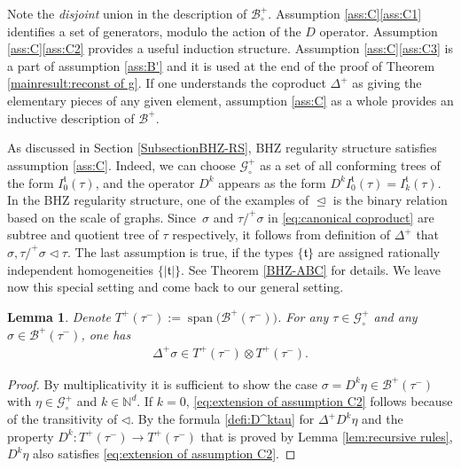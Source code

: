 \documentclass[JEP,XML,SOM,Unicode,published]{cedram}
\DeclareMathOperator{\Span}{span}
\theoremstyle{plain}
\newtheorem{lem}[thm]{Lemma}
\theoremstyle{definition}
\newcommand{\frkt}{\mathfrak{t}}
\let\pord\trianglelefteq
\let\spord\triangleleft
\newcommand{\bbN}{\mathbb{N}}
\newcommand{\mcB}{\mathcal{B}}
\newcommand{\mcG}{\mathcal{G}}
\begin{document}
Note the \emph{disjoint} union in the description of $\mcB_\circ^+$. Assumption \ref{ass:C}\eqref{ass:C1} identifies a set of generators, modulo the action of the $D$ operator. Assumption \ref{ass:C}\eqref{ass:C2} provides a useful induction structure. Assumption \ref{ass:C}\eqref{ass:C3} is a part of assumption \ref{ass:B'} and it is used at the end of the proof of Theorem \ref{mainresult:reconst of g}. If one understands the coproduct $\Delta^+$ as giving the elementary pieces of any given element, assumption \eqref{ass:C} as a whole provides an inductive description of $\mcB^+$.

As discussed in Section \ref{SubsectionBHZ-RS}, BHZ regularity structure satisfies assumption \eqref{ass:C}. Indeed, we can choose $\mcG_\circ^+$ as a set of all conforming trees of the form $I_0^{\mathfrak{t}}(\tau)$, and the operator $D^k$ appears as the form $D^kI_0^{\mathfrak{t}}(\tau)=I_k^{\mathfrak{t}}(\tau)$.
In the BHZ regularity structure, one of the examples of $\pord$ is the binary relation based on the scale of graphs.
Since~$\sigma$ and $\tau/^+\sigma$ in \eqref{eq:canonical coproduct} are subtree and quotient tree of $\tau$ respectively, it follows from definition of $\Delta^+$ that $\sigma,\tau/^+\sigma\spord\tau$.
The last assumption is true, if the types $\{\mathfrak{t}\}$ are assigned rationally independent homogeneities $\{|\frkt|\}$.
See Theorem \ref{BHZ-ABC} for details. We leave now this special setting and come back to our general setting.

\begin{lem}\label{extension of assumption C2}
Denote $T^+(\tau^-)\!:=\!\Span \bigl(\mcB^+(\tau^-)\bigr)$.
For any $\tau\!\in\!\mcG_\circ^+$ and any $\sigma\!\in\!\mcB^+(\tau^-)$, one has
\begin{align}\label{eq:extension of assumption C2}
\Delta^+\sigma\in T^+(\tau^-)\otimes T^+(\tau^-).
\end{align}
\end{lem}

\begin{proof}
By multiplicativity it is sufficient to show the case $\sigma=D^k\eta\in\mcB^+(\tau^-)$ with $\eta\in\mcG_\circ^+$ and $k\in\bbN^d$.
If $k=0$, \eqref{eq:extension of assumption C2} follows because of the transitivity of $\spord$.
By the formula \eqref{defi:D^ktau} for $\Delta^+D^k\eta$ and the property $D^k:T^+(\tau^-)\to T^+(\tau^-)$ that is proved by Lemma \ref{lem:recursive rules}, $D^k\eta$ also satisfies \eqref{eq:extension of assumption C2}.
\end{proof}
\end{document}

